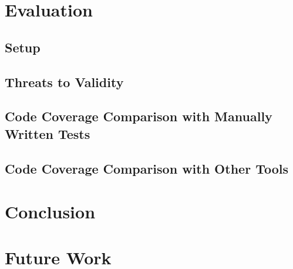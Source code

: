 \documentclass{article}
\begin{document}
\section{Evaluation}
\subsection{Setup}
\subsection{Threats to Validity}
\subsection{Code Coverage Comparison with Manually Written Tests}
\subsection{Code Coverage Comparison with Other Tools}


\section{Conclusion}

\section{Future Work}

\appendix





\end{document}
